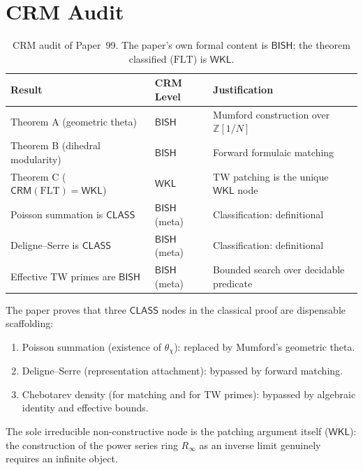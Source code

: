 \documentclass[11pt,a4paper]{article}
\theoremstyle{plain}
\theoremstyle{definition}
\newcommand{\BISH}{\textsf{BISH}}
\newcommand{\WKL}{\textsf{WKL}}
\newcommand{\CLASS}{\textsf{CLASS}}
\newcommand{\CRM}{\textsf{CRM}}
\newcommand{\Z}{\mathbb{Z}}
\begin{document}
\section{CRM Audit}\label{sec:audit}

\begin{table}[ht]
\centering
\begin{tabular}{@{}lll@{}}
\toprule
\textbf{Result} & \textbf{CRM Level} & \textbf{Justification} \\
\midrule
Theorem A (geometric theta) & $\BISH$ & Mumford construction over $\Z[1/N]$ \\
Theorem B (dihedral modularity) & $\BISH$ & Forward formulaic matching \\
Theorem C ($\CRM(\mathrm{FLT}) = \WKL$) & $\WKL$ & TW patching is the unique $\WKL$ node \\
Poisson summation is $\CLASS$ & $\BISH$ (meta) & Classification: definitional \\
Deligne--Serre is $\CLASS$ & $\BISH$ (meta) & Classification: definitional \\
Effective TW primes are $\BISH$ & $\BISH$ (meta) & Bounded search over decidable predicate \\
\bottomrule
\end{tabular}
\caption{CRM audit of Paper~99. The paper's own formal content is $\BISH$; the theorem classified ($\mathrm{FLT}$) is $\WKL$.}
\label{tab:audit}
\end{table}

The paper proves that three $\CLASS$ nodes in the classical proof are dispensable scaffolding:
\begin{enumerate}[label=(\roman*)]
\item Poisson summation (existence of $\theta_\chi$): replaced by Mumford's geometric theta.
\item Deligne--Serre (representation attachment): bypassed by forward matching.
\item Chebotarev density (for matching and for TW primes): bypassed by algebraic identity and effective bounds.
\end{enumerate}
The sole irreducible non-constructive node is the patching argument itself ($\WKL$): the construction of the power series ring $R_\infty$ as an inverse limit genuinely requires an infinite object.


\end{document}

